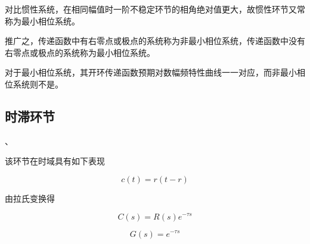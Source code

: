 \documentclass[lang=cn,10pt]{elegantbook}
\begin{document}
对比惯性系统，在相同幅值时一阶不稳定环节的相角绝对值更大，故惯性环节又常称为最小相位系统。

推广之，传递函数中有右零点或极点的系统称为非最小相位系统，传递函数中没有右零点或极点的系统称为最小相位系统。

对于最小相位系统，其开环传递函数预期对数幅频特性曲线一一对应，而非最小相位系统则不是。

\subsection{时滞环节}、

该环节在时域具有如下表现

\begin{equation}
	c(t)=r(t-r)
\end{equation}

由拉氏变换得

\begin{equation}
	C(s)=R(s)e^{-\tau s}
\end{equation}

\begin{equation}
	G(s)=e^{-\tau s}
\end{equation}
\end{document}
